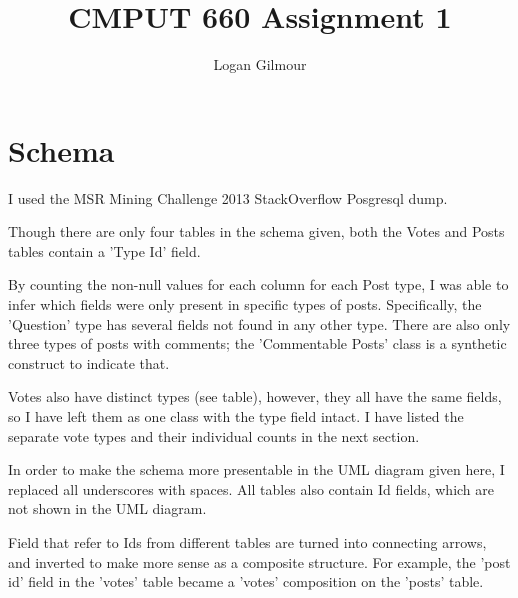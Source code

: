 \documentclass{article}
\begin{document}
\title{CMPUT 660 Assignment 1}
\author{Logan Gilmour}

\maketitle


\section{Schema}

I used the MSR Mining Challenge 2013 StackOverflow Posgresql dump\cite{MSRChallenge2013}.

Though there are only four tables in the schema given, both the Votes and Posts tables contain a 'Type Id' field.

By counting the non-null values for each column for each Post type, I was able to infer which fields were only present in specific types of posts. Specifically, the 'Question' type has several fields not found in any other type. There are also only three types of posts with comments; the 'Commentable Posts' class is a synthetic construct to indicate that.

Votes also have distinct types (see table), however, they all have the same fields, so I have left them as one class with the type field intact. I have listed the separate vote types and their individual counts in the next section.

In order to make the schema more presentable in the UML diagram given here, I replaced all underscores with spaces. All tables also contain Id fields, which are not shown in the UML diagram.

Field that refer to Ids from different tables are turned into connecting arrows, and inverted to make more sense as a composite structure. For example, the 'post id' field in the 'votes' table became a 'votes' composition on the 'posts' table.
\end{document}
